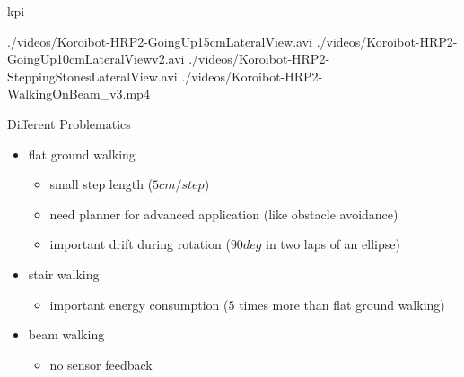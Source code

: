 
\begin{frame}{kpi}
  \begin{center}
    {./videos/Koroibot-HRP2-GoingUp15cmLateralView.avi}
    {./videos/Koroibot-HRP2-GoingUp10cmLateralViewv2.avi}
    {./videos/Koroibot-HRP2-SteppingStonesLateralView.avi}
    {./videos/Koroibot-HRP2-WalkingOnBeam_v3.mp4}
  \end{center}
\end{frame}

\begin{frame}{Different Problematics}

\begin{itemize}
  \item flat ground walking
  \begin{itemize}
    \item small step length ($5cm/step$)
    \item need planner for advanced application (like obstacle avoidance)
    \item important drift during rotation ($90deg$ in two laps of an ellipse)
  \end{itemize}
  
  \item stair walking
  \begin{itemize}
    \item important energy consumption ($5$ times more than flat ground walking)
  \end{itemize}
  
  \item beam walking
  \begin{itemize}
    \item no sensor feedback
  \end{itemize}
\end{itemize}
\end{frame}